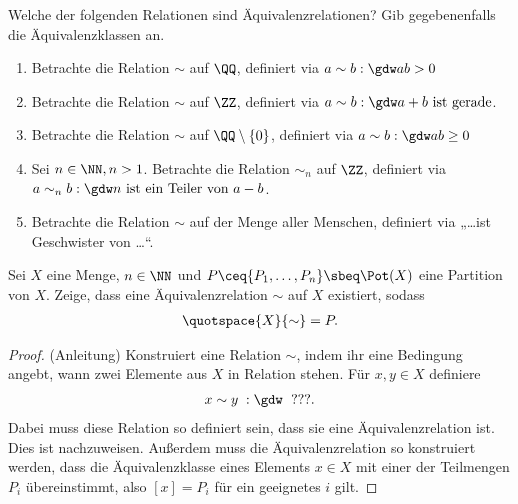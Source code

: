 \begin{aufg}

  Welche der folgenden Relationen sind Äquivalenzrelationen? Gib
  gegebenenfalls die Äquivalenzklassen an.
  \begin{enumerate}
    \item Betrachte die Relation $\sim$ auf $\QQ$, definiert via $a \sim b
      :\gdw ab>0$
    \item Betrachte die Relation $\sim$ auf $\ZZ$, definiert via $a \sim b :\gdw a+b
      \text{ ist gerade}$. 
    \item Betrachte die Relation $\sim$ auf $\QQ\setminus\{0\}$, definiert
      via $a \sim b :\gdw ab\geq 0$
    \item Sei $n\in\NN, n>1$. Betrachte die Relation $\sim_{n}$ auf $\ZZ$,
      definiert via\\
      $a \sim_{n} b :\gdw n \text{ ist ein Teiler von } a-b$.
    \item Betrachte die Relation $\sim$ auf der Menge aller Menschen, definiert via „\dots ist
      Geschwister von \dots“. 
  \end{enumerate}
  
\end{aufg}


\begin{aufg}

  Sei $X$ eine Menge, $n\in\NN$ und $P \ceq \{ P_{1}, \dots, P_{n} \} \sbeq
  \Pot(X)$ eine Partition von $X$. Zeige, dass eine Äquivalenzrelation
  $\sim$ auf $X$ existiert, sodass
  \begin{align*}
    \quotspace{X}{\sim} = P.
  \end{align*}

  \begin{proof}
    (Anleitung) Konstruiert eine Relation $\sim$, indem ihr eine Bedingung
    angebt, wann zwei Elemente aus $X$ in Relation stehen. Für $x,y\in X$
    definiere
    \begin{align*}
      x\sim y \; :\gdw\; \text{ ???}.
    \end{align*}
    Dabei muss diese Relation so definiert sein, dass sie eine
    Äquivalenzrelation ist. Dies ist nachzuweisen. Außerdem muss die
    Äquivalenzrelation so konstruiert werden, dass die Äquivalenzklasse
    eines Elements $x\in X$ mit einer der Teilmengen $P_{i}$ übereinstimmt,
    also $[x] = P_{i}$ für ein geeignetes $i$ gilt.
  \end{proof}
  
\end{aufg}


